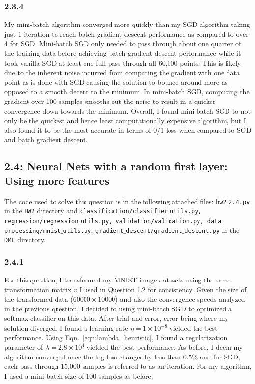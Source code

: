 \documentclass[12pt]{amsart}
\begin{document}
\subsubsection*{2.3.4}

My mini-batch algorithm converged more quickly than my SGD algorithm taking just 1 iteration to reach batch gradient descent performance as compared to over 4 for SGD.  Mini-batch SGD only needed to pass through about one quarter of the training data before achieving batch gradient descent performance while it took vanilla SGD at least one full pass through all 60,000 points.  This is likely due to the inherent noise incurred from computing the gradient with one data point as is done with SGD causing the solution to bounce around more as opposed to a smooth decent to the minimum.  In mini-batch SGD, computing the gradient over 100 samples smooths out the noise to result in a quicker convergence down towards the minimum.  Overall, I found mini-batch SGD to not only be the quickest and hence least computationally expensive algorithm, but I also found it to be the most accurate in terms of 0/1 loss when compared to SGD and batch gradient descent.

\subsection*{2.4: Neural Nets with a random first layer: Using more features}

The code used to solve this question is in the following attached files: {\tt hw2$\_$2.4.py} in the {\tt HW2} directory and {\tt classification/classifier$\_$utils.py, regression/regression$\_$utils.py, validation/validation.py, data$\_$processing/mnist$\_$utils.py}, 
{\tt gradient$\_$descent/gradient$\_$descent.py} in the {\tt DML} directory.

\subsubsection*{2.4.1}

For this question, I transformed my MNIST image datasets using the same transformation matrix $v$ I used in Question 1.2 for consistency.  Given the size of the transformed data ($60000 \times 10000$) and also the convergence speeds analyzed in the previous question, I decided to using mini-batch SGD to optimized a softmax classifier on this data.  After trial and error, error being where my solution diverged, I found a learning rate $\eta = 1 \times 10^{-8}$ yielded the best performance.  Using Eqn.~\ref{eqn:lambda_heuristic}, I found a regularization parameter of $\lambda = 2.8 \times 10^{4}$ yielded the best performance.  As before, I deem my algorithm converged once the log-loss changes by less than $0.5\%$ and for SGD, each pass through 15,000 samples is referred to as an iteration.  For my algorithm, I used a mini-batch size of 100 samples as before.
\end{document}
